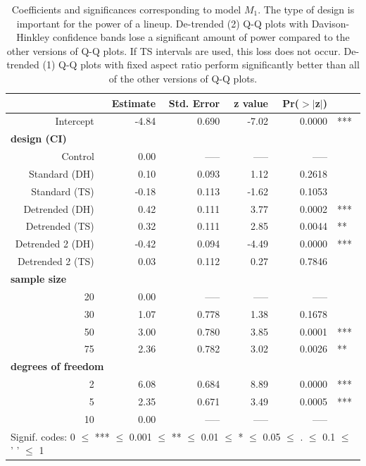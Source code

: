 \documentclass{article}\usepackage[]{graphicx}\usepackage[]{color}
\newcommand{\hh}[1]{{\color{magenta} #1}}
\begin{document}
\begin{appendix}
\begin{table}[ht]
\centering
\caption{\label{tab:model} Coefficients and significances corresponding to  model $M_1$. The type of design is important for the power of a lineup. \hh{ De-trended (2) Q-Q plots with Davison-Hinkley confidence bands lose a significant amount of power compared to the other  versions of Q-Q plots. If TS intervals are used, this loss does not occur. De-trended (1) Q-Q plots with fixed aspect ratio perform significantly better than all of the other versions of Q-Q plots.}}
\begin{tabular}{rrrrrl}
   \hline
  &\bf Estimate &\bf Std. Error &\bf z value &\bf Pr($>$$|$z$|$) & \\ 
   \hline
    Intercept & -4.84 & 0.690 & -7.02 & 0.0000 & ***\\ 
 \multicolumn{3}{l}{\bf design (CI)} \\
   Control & 0.00 & ----- & ----- & ----- \\ [2pt]
   Standard (DH) & 0.10 & 0.093 & 1.12 & 0.2618 \\ 
   Standard (TS) & -0.18 & 0.113 & -1.62 & 0.1053 \\ [2pt]
   Detrended (DH) & 0.42 & 0.111 & 3.77 & 0.0002 & ***\\ 
   Detrended (TS) & 0.32 & 0.111 & 2.85 & 0.0044 & **\\ [2pt]
   Detrended 2 (DH) & -0.42 & 0.094 & -4.49 & 0.0000 & ***\\ 
   Detrended 2 (TS) & 0.03 & 0.112 & 0.27 & 0.7846 \\ [3pt]
 \multicolumn{3}{l}{\bf sample size} \\
   20 & 0.00 & ----- & ----- & ----- \\ 
   30 & 1.07 & 0.778 & 1.38 & 0.1678 \\ 
   50 & 3.00 & 0.780 & 3.85 & 0.0001 & ***\\ 
   75 & 2.36 & 0.782 & 3.02 & 0.0026 & **\\ [3pt]
 \multicolumn{3}{l}{\bf degrees of freedom} \\
  2 & 6.08 & 0.684 & 8.89 & 0.0000 & ***\\ 
  5 & 2.35 & 0.671 & 3.49 & 0.0005 & ***\\ 
  10 & 0.00 & ----- & ----- & ----- \\ 
    \hline
\multicolumn{6}{l}{Signif. codes:  0 $\le$ *** $\le$ 0.001 $\le$ ** $\le$ 0.01 $\le$ * $\le$ 0.05 $\le$ . $\le$ 0.1 $\le$ ' ' $\le$ 1}
\end{tabular}
\end{table}
\afterpage{\clearpage}


\end{appendix}
\end{document}
